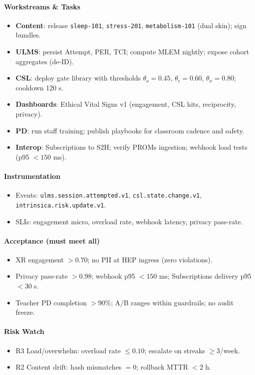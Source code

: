 \documentclass[11pt]{article}
\theoremstyle{plain}
\begin{document}
\paragraph{Workstreams \& Tasks}
\begin{itemize}
  \item \textbf{Content}: release \texttt{sleep-101}, \texttt{stress-201}, \texttt{metabolism-101} (dual skin); sign bundles.
  \item \textbf{ULMS}: persist Attempt, PER, TCI; compute MLEM nightly; expose cohort aggregates (de-ID).
  \item \textbf{CSL}: deploy gate library with thresholds $\theta_o=0.45$, $\theta_c=0.60$, $\theta_x=0.80$; cooldown 120 s.
  \item \textbf{Dashboards}: Ethical Vital Signs v1 (engagement, CSL hits, reciprocity, privacy).
  \item \textbf{PD}: run staff training; publish playbooks for classroom cadence and safety.
  \item \textbf{Interop}: Subscriptions to S2H; verify PROMs ingestion; webhook load tests (p95 $<150$ ms).
\end{itemize}

\paragraph{Instrumentation}
\begin{itemize}
  \item Events: \texttt{ulms.session.attempted.v1}, \texttt{csl.state.change.v1}, \texttt{intrinsica.risk.update.v1}.
  \item SLIs: engagement micro, overload rate, webhook latency, privacy pass-rate.
\end{itemize}

\paragraph{Acceptance (must meet all)}
\begin{itemize}
  \item XR engagement $>0.70$; no PII at HEP ingress (zero violations).
  \item Privacy pass-rate $>0.98$; webhook p95 $<150$ ms; Subscriptions delivery p95 $<30$ s.
  \item Teacher PD completion $>90\%$; A/B ranges within guardrails; no audit freeze.
\end{itemize}

\paragraph{Risk Watch}
\begin{itemize}
  \item R3 Load/overwhelm: overload rate $\le 0.10$; escalate on streaks $\ge 3$/week.
  \item R2 Content drift: hash mismatches $=0$; rollback MTTR $<2$ h.
\end{itemize}
\end{document}

